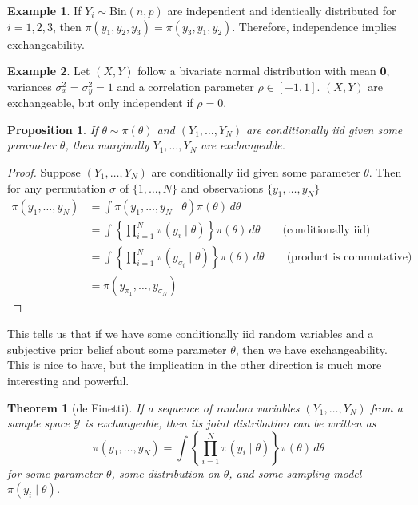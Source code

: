 \documentclass[
]{book}
\newtheorem{theorem}{Theorem}[chapter]
\newtheorem{proposition}{Proposition}[chapter]
\theoremstyle{definition}
\theoremstyle{definition}
\newtheorem{example}{Example}[chapter]
\theoremstyle{definition}
\theoremstyle{definition}
\theoremstyle{remark}
\begin{document}
\begin{example}
If \(Y_i \sim \text{Bin}(n, p)\) are independent and identically distributed for \(i = 1, 2, 3\), then \(\pi(y_1, y_2, y_3) = \pi(y_3, y_1, y_2)\). Therefore, independence implies exchangeability.
\end{example}

\begin{example}
Let \((X, Y)\) follow a bivariate normal distribution with mean \textbf{0}, variances \(\sigma_x^2 = \sigma_y^2 = 1\) and a correlation parameter \(\rho \in [-1, 1]\). \((X, Y)\) are exchangeable, but only independent if \(\rho = 0\).
\end{example}

\begin{proposition}
If \(\theta \sim \pi(\theta)\) and \((Y_1, \ldots, Y_N)\) are conditionally iid given some parameter \(\theta\), then marginally \(Y_1, \ldots, Y_N\) are exchangeable.
\end{proposition}

\begin{proof}
Suppose \((Y_1, \ldots, Y_N)\) are conditionally iid given some parameter \(\theta\). Then for any permutation \(\sigma\) of \(\{1, \ldots, N\}\) and observations \(\{y_1, \ldots, y_N\}\)
\begin{equation}
\begin{split}
\pi(y_1, \ldots, y_N) &= \int \pi(y_1, \ldots, y_N \mid \theta) \pi(\theta)\, d\theta \qquad \\
 & = \int \left\{\prod_{i=1}^N\pi(y_i \mid \theta)\right\} \pi(\theta)\, d\theta \qquad \textrm{(conditionally iid)}\\
& = \int \left\{\prod_{i=1}^N\pi(y_{\sigma_i} \mid \theta)\right\} \pi(\theta)\, d\theta \qquad \textrm{(product is commutative)} \\
 & = \pi(y_{\pi_1}, \ldots, y_{\sigma_N}) \qquad 
\end{split}
\end{equation}
\end{proof}

This tells us that if we have some conditionally iid random variables and a subjective prior belief about some parameter \(\theta\), then we have exchangeability. This is nice to have, but the implication in the other direction is much more interesting and powerful.

\begin{theorem}[de Finetti]
If a sequence of random variables \((Y_1, \ldots, Y_N)\) from a sample space \(\mathcal{Y}\) is exchangeable, then its joint distribution can be written as
\[
\pi(y_1, \ldots, y_N) = \int \left\{\prod_{i=1}^N\pi(y_i \mid \theta)\right\} \pi(\theta)\, d\theta
\]
for some parameter \(\theta\), some distribution on \(\theta\), and some sampling model \(\pi(y_i \mid \theta)\).
\end{theorem}
\end{document}

